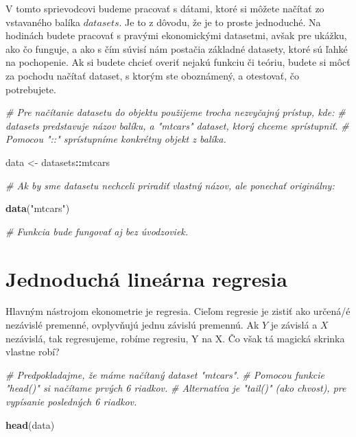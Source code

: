 \documentclass[]{article}
\newenvironment{Shaded}{\begin{snugshade}}{\end{snugshade}}
\newcommand{\CommentTok}[1]{\textcolor[rgb]{0.56,0.35,0.01}{\textit{#1}}}
\newcommand{\KeywordTok}[1]{\textcolor[rgb]{0.13,0.29,0.53}{\textbf{#1}}}
\newcommand{\NormalTok}[1]{#1}
\newcommand{\OperatorTok}[1]{\textcolor[rgb]{0.81,0.36,0.00}{\textbf{#1}}}
\newcommand{\StringTok}[1]{\textcolor[rgb]{0.31,0.60,0.02}{#1}}
\begin{document}
V tomto sprievodcovi budeme pracovať s dátami, ktoré si môžete načítať
zo vstavaného balíka \(datasets\). Je to z dôvodu, že je to proste
jednoduché. Na hodinách budete pracovať s pravými ekonomickými
datasetmi, avšak pre ukážku, ako čo funguje, a ako s čím súvisí nám
postačia základné datasety, ktoré sú ľahké na pochopenie. Ak si budete
chcieť overiť nejakú funkciu či teóriu, budete si môcť za pochodu
načítať dataset, s ktorým ste oboznámený, a otestovať, čo potrebujete.

\begin{Shaded}
\begin{Highlighting}[]
\CommentTok{# Pre načítanie datasetu do objektu použijeme trocha nezvyčajný prístup, kde:}
\CommentTok{# datasets predstavuje názov balíku, a "mtcars" dataset, ktorý chceme sprístupniť.}
\CommentTok{# Pomocou "::" sprístupníme konkrétny objekt z balíka.}

\NormalTok{data <-}\StringTok{ }\NormalTok{datasets}\OperatorTok{::}\NormalTok{mtcars}

\CommentTok{# Ak by sme datasetu nechceli priradiť vlastný názov, ale ponechať originálny:}

\KeywordTok{data}\NormalTok{(}\StringTok{"mtcars"}\NormalTok{)}

\CommentTok{# Funkcia bude fungovať aj bez úvodzoviek.}
\end{Highlighting}
\end{Shaded}

\hypertarget{jednoduchuxe1-lineuxe1rna-regresia}{%
\section{Jednoduchá lineárna
regresia}\label{jednoduchuxe1-lineuxe1rna-regresia}}

Hlavným nástrojom ekonometrie je regresia. Cieľom regresie je zistiť ako
určená/é nezávislé premenné, ovplyvňujú jednu závislú premennú. Ak \(Y\)
je závislá a \(X\) nezávislá, tak regresujeme, robíme regresiu, Y na X.
Čo však tá magická skrinka vlastne robí?

\begin{Shaded}
\begin{Highlighting}[]
\CommentTok{# Predpokladajme, že máme načítaný dataset "mtcars".}
\CommentTok{# Pomocou funkcie "head()" si načítame prvých 6 riadkov.}
\CommentTok{# Alternatíva je "tail()" (ako chvost), pre vypísanie posledných 6 riadkov.}

\KeywordTok{head}\NormalTok{(data)}
\end{Highlighting}
\end{Shaded}
\end{document}
